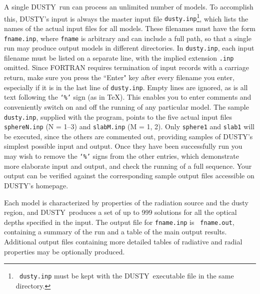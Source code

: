 \documentclass[12pt]{article} \usepackage{epsf}
\def\D  {{\sf DUSTY}}
\begin{document}
A single \D\ run can process an unlimited number of models.  To accomplish
this, \D's input is always the master input file {\tt dusty.inp}\footnote{{\tt
dusty.inp} must be kept with the \D\ executable file in the same directory.},
which lists the names of the actual input files for all models.  These
filenames must have the form {\tt fname.inp}, where {\tt fname} is arbitrary
and can include a full path, so that a single run may produce output models in
different directories. In {\tt dusty.inp}, each input filename must be listed
on a separate line, with the implied extension {\tt .inp} omitted. Since
FORTRAN requires termination of input records with a carriage return, make sure
you press the ``Enter" key after every filename you enter, especially if it is
in the last line of {\tt dusty.inp}.  Empty lines are ignored, as is all text
following the {\tt `\%'} sign (as in \TeX).  This enables you to enter comments
and conveniently switch on and off the running of any particular model.  The
sample {\tt dusty.inp}, supplied with the program, points to the five actual
input files {\tt sphereN.inp} (N = 1--3) and {\tt slabM.inp} (M = 1, 2). Only
{\tt sphere1} and {\tt slab1} will be executed, since the others are commented
out, providing samples of \D's simplest possible input and output. Once they
have been successfully run you may wish to remove the {\tt `\%'} signs from the
other entries, which demonstrate more elaborate input and output, and check the
running of a full sequence. Your output can be verified against the
corresponding sample output files accessible on \D's homepage.

Each model is characterized by properties of the radiation source and the dusty
region, and \D\ produces a set of up to 999 solutions for all the optical
depths specified in the input.  The output file for {\tt fname.inp} is {\tt
fname.out}, containing a summary of the run and a table of the main output
results. Additional output files containing more detailed tables of radiative
and radial properties may be optionally produced.
\end{document}
